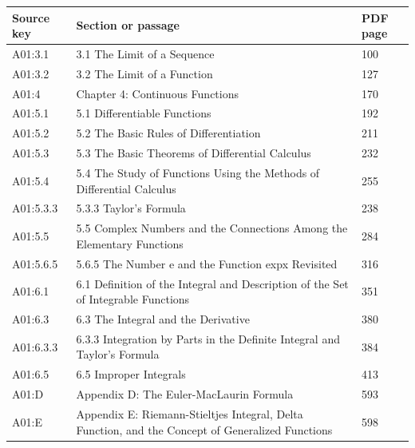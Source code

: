 \begin{longtable}{p{22mm}p{99mm}p{20mm}}

\toprule Source key & Section or passage & PDF page \\\midrule\endhead

A01:3.1 & 3.1 The Limit of a Sequence & 100 \\

A01:3.2 & 3.2 The Limit of a Function & 127 \\

A01:4 & Chapter 4: Continuous Functions & 170 \\

A01:5.1 & 5.1 Differentiable Functions & 192 \\

A01:5.2 & 5.2 The Basic Rules of Differentiation & 211 \\

A01:5.3 & 5.3 The Basic Theorems of Differential Calculus & 232 \\

A01:5.4 & 5.4 The Study of Functions Using the Methods of Differential Calculus & 255 \\

A01:5.3.3 & 5.3.3 Taylor's Formula & 238 \\

A01:5.5 & 5.5 Complex Numbers and the Connections Among the Elementary Functions & 284 \\

A01:5.6.5 & 5.6.5 The Number e and the Function expx Revisited & 316 \\

A01:6.1 & 6.1 Definition of the Integral and Description of the Set of Integrable Functions & 351 \\

A01:6.3 & 6.3 The Integral and the Derivative & 380 \\

A01:6.3.3 & 6.3.3 Integration by Parts in the Definite Integral and Taylor's Formula & 384 \\

A01:6.5 & 6.5 Improper Integrals & 413 \\

A01:D & Appendix D: The Euler-MacLaurin Formula & 593 \\

A01:E & Appendix E: Riemann-Stieltjes Integral, Delta Function, and the Concept of Generalized Functions & 598 \\


\end{longtable}
